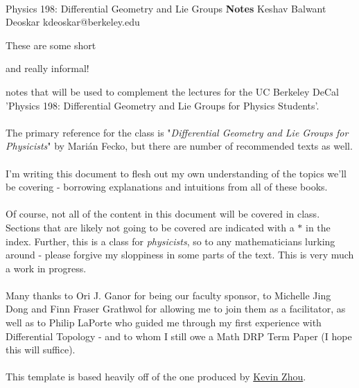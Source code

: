 \documentclass[11pt]{article}
\begin{document}
\thispagestyle{empty}
\bigskip \
\vspace{0.1cm}

\begin{center}
{\fontsize{22}{22} \selectfont Physics 198: Differential Geometry and Lie Groups}
\vskip 16pt
{\fontsize{36}{36} \selectfont \bf \sffamily Notes}
\vskip 24pt
{\fontsize{18}{18} \selectfont \rmfamily Keshav Balwant Deoskar} 
\vskip 6pt
{\fontsize{14}{14} \selectfont \ttfamily kdeoskar@berkeley.edu} 
\vskip 24pt
\end{center}



These are some short \begin{note} {and really informal!} \end{note} notes that will be used to complement the lectures for the UC Berkeley DeCal 'Physics 198: Differential Geometry and Lie Groups for Physics Students'. 
\\
\\
The primary reference for the class is "\textit{Differential Geometry and Lie Groups for Physicists}" by Marián Fecko, but there are number of recommended texts as well.
\\
\\
I'm writing this document to flesh out my own understanding of the topics we'll be covering - borrowing explanations and intuitions from all of these books.
\\
\\
Of course, not all of the content in this document will be covered in class. Sections that are likely not going to be covered are indicated with a $*$ in the index. Further, this is a class for \emph{physicists}, so to any mathematicians lurking around - please forgive my sloppiness in some parts of the text. This is very much a work in progress. 
\\
\\
Many thanks to Ori J. Ganor for being our faculty sponsor, to Michelle Jing Dong and Finn Fraser Grathwol for allowing me to join them as a facilitator, as well as to Philip LaPorte who guided me through my first experience with Differential Topology - and to whom I still owe a Math DRP Term Paper (I hope this will suffice).
\\
\\
This template is based heavily off of the one produced by \href{https://knzhou.github.io/}{Kevin Zhou}.
\end{document}
